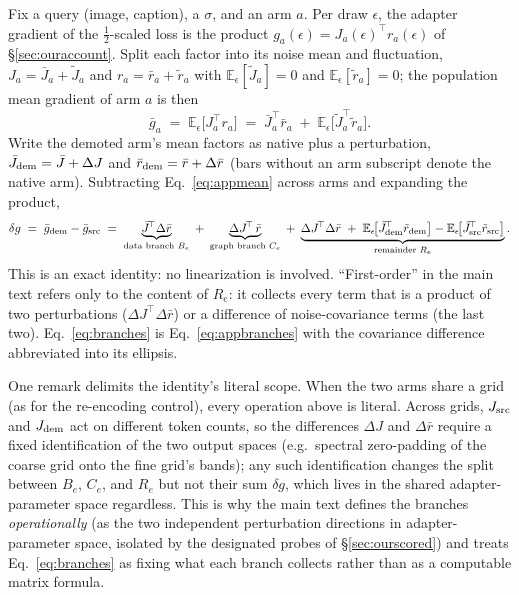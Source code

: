 Fix a query (image, caption), a $\sigma$, and an arm $a$. Per draw
$\epsilon$, the adapter gradient of the $\tfrac12$-scaled loss is the
product $g_a(\epsilon) = J_a(\epsilon)^{\!\top} r_a(\epsilon)$ of
\S\ref{sec:ouraccount}. Split each factor into its noise mean and
fluctuation, $J_a = \bar J_a + \tilde J_a$ and
$r_a = \bar r_a + \tilde r_a$ with
$\mathbb{E}_\epsilon[\tilde J_a] = 0$ and
$\mathbb{E}_\epsilon[\tilde r_a] = 0$; the population mean gradient of
arm $a$ is then
\begin{equation}
\bar g_a \;=\; \mathbb{E}_\epsilon\!\big[J_a^{\!\top} r_a\big]
\;=\; \bar J_a^{\!\top} \bar r_a
\;+\; \mathbb{E}_\epsilon\!\big[\tilde J_a^{\!\top} \tilde r_a\big].
\label{eq:appmean}
\end{equation}
Write the demoted arm's mean factors as native plus a perturbation,
$\bar J_{\mathrm{dem}} = \bar J + \Delta J$ and $\bar r_{\mathrm{dem}} = \bar r + \Delta \bar r$
(bars without an arm subscript denote the native arm). Subtracting
Eq.~\ref{eq:appmean} across arms and expanding the product,
\begin{equation}
\delta g \;=\; \bar g_{\mathrm{dem}} - \bar g_{\mathrm{src}}
\;=\;
\underbrace{\bar J^{\!\top} \Delta\bar r}_{\text{data branch }B_e}
\;+\;
\underbrace{\Delta J^{\!\top}\, \bar r}_{\text{graph branch }C_e}
\;+\;
\underbrace{\Delta J^{\!\top} \Delta\bar r
\;+\;
\mathbb{E}_\epsilon\!\big[\tilde J_{\mathrm{dem}}^{\!\top}\tilde r_{\mathrm{dem}}\big]
- \mathbb{E}_\epsilon\!\big[\tilde J_{\mathrm{src}}^{\!\top}
\tilde r_{\mathrm{src}}\big]}_{\text{remainder }R_e}.
\label{eq:appbranches}
\end{equation}
This is an exact identity: no linearization is involved.
``First-order'' in the main text refers only to the content of $R_e$:
it collects every term that is a product of two perturbations
($\Delta J^{\!\top} \Delta\bar r$) or a difference of noise-covariance
terms (the last two). Eq.~\ref{eq:branches} is
Eq.~\ref{eq:appbranches} with the covariance difference abbreviated
into its ellipsis.

One remark delimits the identity's literal scope. When the two arms
share a grid (as for the re-encoding control), every operation above is
literal. Across grids, $J_{\mathrm{src}}$ and $J_{\mathrm{dem}}$ act on different
token counts, so the differences $\Delta J$ and $\Delta \bar r$ require
a fixed identification of the two output spaces (e.g.\ spectral
zero-padding of the coarse grid onto the fine grid's bands); any such
identification changes the split between $B_e$, $C_e$, and $R_e$ but
not their sum $\delta g$, which lives in the shared adapter-parameter
space regardless. This is why the main text defines the branches
\emph{operationally} (as the two independent perturbation directions
in adapter-parameter space, isolated by the designated probes of
\S\ref{sec:ourscored}) and treats Eq.~\ref{eq:branches} as fixing what
each branch collects rather than as a computable matrix formula.


